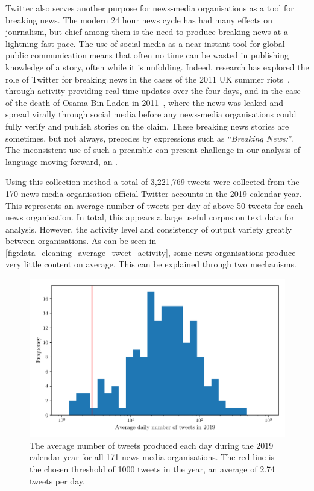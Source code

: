 Twitter also serves another purpose for news-media organisations as a tool for breaking news. The modern 24 hour news cycle has had many effects on journalism, but chief among them is the need to produce breaking news at a lightning fast pace. The use of social media as a near instant tool for global public communication means that often no time can be wasted in publishing knowledge of a story, often while it is unfolding. Indeed, research has explored the role of Twitter for breaking news in the cases of the 2011 UK summer riots~\cite{vis_twitter_2013}, through activity providing real time updates over the four days, and in the case of the death of Osama Bin Laden in 2011~\cite{hu_breaking_2012}, where the news was leaked and spread virally through social media before any news-media organisations could fully verify and publish stories on the claim. These breaking news stories are sometimes, but not always, precedes by expressions such as ``\emph{Breaking News:}''. The inconsistent use of such a preamble can present challenge in our analysis of language moving forward, an .

Using this collection method a total of 3,221,769 tweets were collected from the 170 news-media organisation official Twitter accounts in the 2019 calendar year. This represents an average number of tweets per day of above 50 tweets for each news organisation. In total, this appears a large useful corpus on text data for analysis. However, the activity level and consistency of output variety greatly between organisations. As can be seen in \autoref{fig:data_cleaning_average_tweet_activity}, some news organisations produce very little content on average. This can be explained through two mechanisms.

\begin{figure}
	\centering
	\includegraphics[width=0.7\linewidth]{chapter1/figs/averagetweetactivity}
	\caption{The average number of tweets produced each day during the 2019 calendar year for all 171 news-media organisations. The red line is the chosen threshold of 1000 tweets in the year, an average of 2.74 tweets per day.}
	\label{fig:data_cleaning_average_tweet_activity}
\end{figure}


